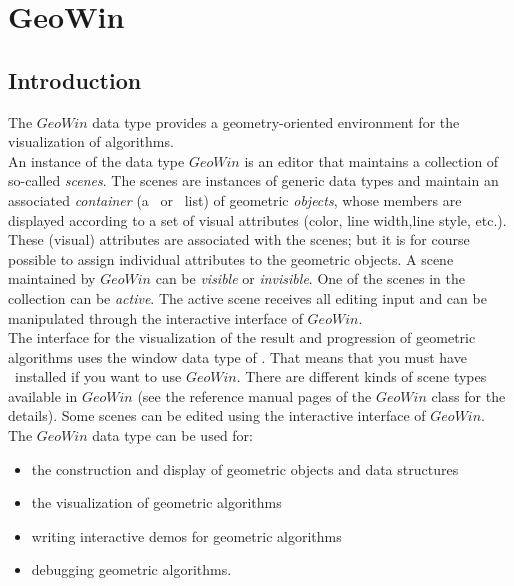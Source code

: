 
\ccParDims

\chapter{GeoWin}
\label{chapterGeoWin}


\section{Introduction}

The $GeoWin$ data type provides a geometry-oriented environment for the visualization
of algorithms. \\
An instance of the data type $GeoWin$ is an editor that maintains 
a collection of so-called {\em scenes}. 
The scenes are instances of generic data types and maintain an associated {\em container} (a \stl\ or \leda\ list)
of geometric {\em objects}, whose members are displayed according to a set of visual attributes 
(color, line width,line style, etc.). \\
These (visual) attributes are associated with the scenes; but it is for course possible to
assign individual attributes to the geometric objects.
A scene maintained by $GeoWin$ can be {\em visible} or {\em invisible}. 
One of the scenes in the collection can be {\em active}. 
The active scene receives all editing input and can be manipulated
through the interactive interface of $GeoWin$. \\
The interface for the visualization 
of the result and progression of geometric algorithms uses the window data type of \leda. That means that you
must have \leda\ installed if you want to use $GeoWin$.
There are different kinds of scene types available in $GeoWin$ (see the reference manual pages of the
$GeoWin$ class for the details). Some scenes can be edited using the interactive interface of $GeoWin$.
The $GeoWin$ data type can be used for:

\begin{itemize}

\item the construction and display of geometric objects and data structures
\item the visualization of geometric algorithms
\item writing interactive demos for geometric algorithms
\item debugging geometric algorithms.

\end{itemize}

